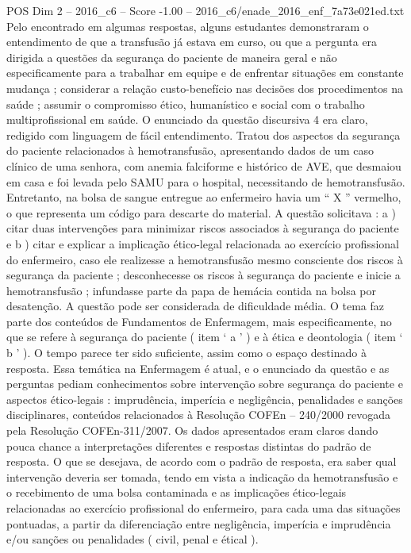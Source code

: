 \begin{textsample}{POS Dim 2 – 2016\_c6 – Score -1.00 – 2016\_c6/enade\_2016\_enf\_7a73e021ed.txt}
Pelo encontrado em algumas respostas, alguns estudantes demonstraram o entendimento de que a transfusão já estava em curso, ou que a pergunta era dirigida a questões da segurança do paciente de maneira geral e não especificamente para a trabalhar em equipe e de enfrentar situações em constante mudança ; considerar a relação custo-benefício nas decisões dos procedimentos na saúde ; assumir o compromisso ético, humanístico e social com o trabalho multiprofissional em saúde.
O enunciado da questão discursiva 4 era claro, redigido com linguagem de fácil entendimento.
Tratou dos aspectos da segurança do paciente relacionados à hemotransfusão, apresentando dados de um caso clínico de uma senhora, com anemia falciforme e histórico de AVE, que desmaiou em casa e foi levada pelo SAMU para o hospital, necessitando de hemotransfusão.
Entretanto, na bolsa de sangue entregue ao enfermeiro havia um “ X ” vermelho, o que representa um código para descarte do material.
A questão solicitava : a ) citar duas intervenções para minimizar riscos associados à segurança do paciente e b ) citar e explicar a implicação ético-legal relacionada ao exercício profissional do enfermeiro, caso ele realizesse a hemotransfusão mesmo consciente dos riscos à segurança da paciente ; desconhecesse os riscos à segurança do paciente e inicie a hemotransfusão ; infundasse parte da papa de hemácia contida na bolsa por desatenção.
A questão pode ser considerada de dificuldade média.
O tema faz parte dos conteúdos de Fundamentos de Enfermagem, mais especificamente, no que se refere à segurança do paciente ( item ‘ a ’ ) e à ética e deontologia ( item ‘ b ’ ).
O tempo parece ter sido suficiente, assim como o espaço destinado à resposta.
Essa temática na Enfermagem é atual, e o enunciado da questão e as perguntas pediam conhecimentos sobre intervenção sobre segurança do paciente e aspectos ético-legais : imprudência, imperícia e negligência, penalidades e sanções disciplinares, conteúdos relacionados à Resolução COFEn – 240/2000 revogada pela Resolução COFEn-311/2007.
Os dados apresentados eram claros dando pouca chance a interpretações diferentes e respostas distintas do padrão de resposta.
O que se desejava, de acordo com o padrão de resposta, era saber qual intervenção deveria ser tomada, tendo em vista a indicação da hemotransfusão e o recebimento de uma bolsa contaminada e as implicações ético-legais relacionadas ao exercício profissional do enfermeiro, para cada uma das situações pontuadas, a partir da diferenciação entre negligência, imperícia e imprudência e/ou sanções ou penalidades ( civil, penal e étical ).

\end{textsample}
